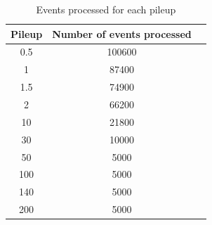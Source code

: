 \begin{table}[ht]
  \centering
  \caption{Events processed for each pileup}
  \begin{tabular}{ccc}
     \textbf{Pileup} & \textbf{Number of events processed} \\
     \hline
     0.5 &  100600 \\
     1&    87400\\
      1.5& 74900 \\
      2&  66200 \\
     10&   21800 \\
     30&    10000\\
      50&   5000\\
      100&   5000\\
     140&    5000\\
       200&    5000\\
  \end{tabular}
  \label{tab:12}
\end{table}


